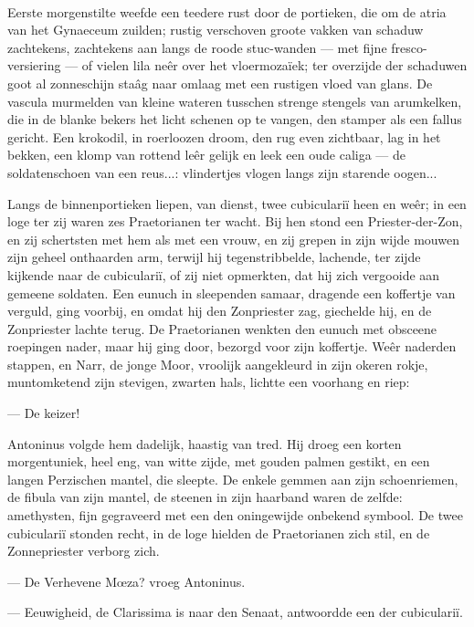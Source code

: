 \documentclass[a4paper, 12pt, oneside, dutch]{article}
\begin{document}
\paragraph{}
Eerste morgenstilte weefde een teedere rust door de portieken, die om de atria van het Gynaeceum zuilden; rustig verschoven groote vakken van schaduw zachtekens, zachtekens aan langs de roode stuc-wanden --- met fijne fresco-versiering --- of vielen lila neêr over het vloermozaïek; ter overzijde der schaduwen goot al zonneschijn staâg naar omlaag met een rustigen vloed van glans. De vascula murmelden van kleine wateren tusschen strenge stengels van arumkelken, die in de blanke bekers het licht schenen op te vangen, den stamper als een fallus gericht. Een krokodil, in roerloozen droom, den rug even zichtbaar, lag in het bekken, een klomp van rottend leêr gelijk en leek een oude caliga --- de soldatenschoen van een reus...: vlindertjes vlogen langs zijn starende oogen...

Langs de binnenportieken liepen, van dienst, twee cubiculariï heen en weêr; in een loge ter zij waren zes Praetorianen ter wacht. Bij hen stond een Priester-der-Zon, en zij schertsten met hem als met een vrouw, en zij grepen in zijn wijde mouwen zijn geheel onthaarden arm, terwijl hij tegenstribbelde, lachende, ter zijde kijkende naar de cubiculariï, of zij niet opmerkten, dat hij zich vergooide aan gemeene soldaten. Een eunuch in sleependen samaar, dragende een koffertje van verguld, ging voorbij, en omdat hij den Zonpriester zag, giechelde hij, en de Zonpriester lachte terug. De Praetorianen wenkten den eunuch met obsceene roepingen nader, maar hij ging door, bezorgd voor zijn koffertje. Weêr naderden stappen, en Narr, de jonge Moor, vroolijk aangekleurd in zijn okeren rokje, muntomketend zijn stevigen, zwarten hals, lichtte een voorhang en riep:

--- De keizer!

Antoninus volgde hem dadelijk, haastig van tred. Hij droeg een korten morgentuniek, heel eng, van witte zijde, met gouden palmen gestikt, en een langen Perzischen mantel, die sleepte. De enkele gemmen aan zijn schoenriemen, de fibula van zijn mantel, de steenen in zijn haarband waren de zelfde: amethysten, fijn gegraveerd met een den oningewijde onbekend symbool. De twee cubiculariï stonden recht, in de loge hielden de Praetorianen zich stil, en de Zonnepriester verborg zich.

--- De Verhevene Mœza? vroeg Antoninus.

--- Eeuwigheid, de Clarissima is naar den Senaat, antwoordde een der cubiculariï.
\end{document}
